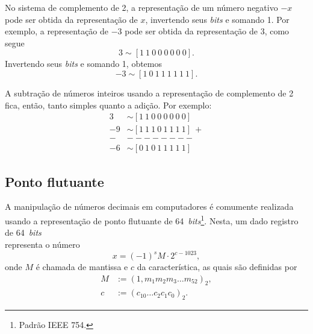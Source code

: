 No sistema de complemento de 2, a representação de um número negativo $-x$ pode ser obtida da representação de $x$, invertendo seus {\it bits} e somando 1. Por exemplo, a representação de $-3$ pode ser obtida da representação de $3$, como segue
\begin{equation}
  3 \sim [1 ~ 1 ~ 0 ~ 0 ~ 0 ~ 0 ~ 0 ~ 0].
\end{equation}
Invertendo seus {\it bits} e somando 1, obtemos
\begin{equation}
  -3 \sim [1 ~ 0 ~ 1 ~ 1 ~ 1 ~ 1 ~ 1 ~ 1].
\end{equation}

A subtração de números inteiros usando a representação de complemento de 2 fica, então, tanto simples quanto a adição. Por exemplo:
\begin{align}
  3 &\sim [1 ~ 1 ~ 0 ~ 0 ~ 0 ~ 0 ~ 0 ~ 0]\\
 -9 &\sim [1 ~ 1 ~ 1 ~ 0 ~ 1 ~ 1 ~ 1 ~ 1] ~ + \\
  - & -------- \\
 -6 &\sim [0 ~ 1 ~ 0 ~ 1 ~ 1 ~ 1 ~ 1 ~ 1]
\end{align}

\subsection{Ponto flutuante}

A manipulação de números decimais em computadores é comumente realizada usando a representação de ponto flutuante de 64~{\it bits}\footnote{Padrão IEEE 754.}. Nesta, um dado registro de 64~{\it bits}
\begin{equation}
  [s ~ | ~ c_{10} ~ c_9 ~ \ldots ~ c_{0} ~ | ~ m_1 ~ m_2 ~ \ldots ~ m_{52}]
\end{equation}
representa o número
\begin{equation}
  x = (-1)^s M\cdot 2^{c - 1023},
\end{equation}
onde $M$ é chamada de mantissa e $c$ da característica, as quais são definidas por
\begin{align}
  M &:= (1,m_1m_2m_3\ldots m_{52})_2,\\
  c &:= (c_{10}\ldots c_2c_1c_0)_2.
\end{align}

